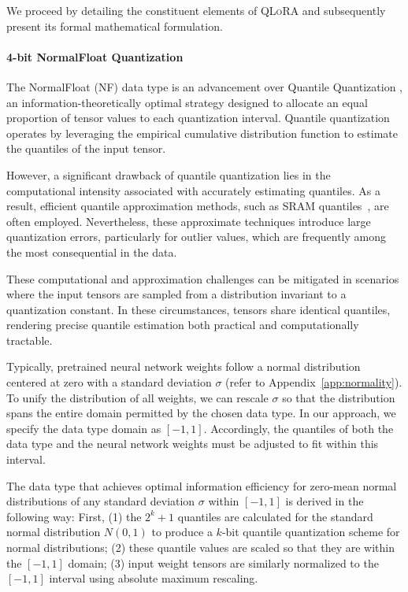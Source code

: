 We proceed by detailing the constituent elements of \textsc{QLoRA} and subsequently present its formal mathematical formulation.

\paragraph{4-bit NormalFloat Quantization} The NormalFloat (NF) data type is an advancement over Quantile Quantization \citep{dettmers2022optimizers}, an information-theoretically optimal strategy designed to allocate an equal proportion of tensor values to each quantization interval. Quantile quantization operates by leveraging the empirical cumulative distribution function to estimate the quantiles of the input tensor.

However, a significant drawback of quantile quantization lies in the computational intensity associated with accurately estimating quantiles. As a result, efficient quantile approximation methods, such as SRAM quantiles~\citep{dettmers2022optimizers}, are often employed. Nevertheless, these approximate techniques introduce large quantization errors, particularly for outlier values, which are frequently among the most consequential in the data.

These computational and approximation challenges can be mitigated in scenarios where the input tensors are sampled from a distribution invariant to a quantization constant. In these circumstances, tensors share identical quantiles, rendering precise quantile estimation both practical and computationally tractable.

Typically, pretrained neural network weights follow a normal distribution centered at zero with a standard deviation $\sigma$ (refer to Appendix~\ref{app:normality}). To unify the distribution of all weights, we can rescale $\sigma$ so that the distribution spans the entire domain permitted by the chosen data type. In our approach, we specify the data type domain as $[-1, 1]$. Accordingly, the quantiles of both the data type and the neural network weights must be adjusted to fit within this interval.

The data type that achieves optimal information efficiency for zero-mean normal distributions of any standard deviation $\sigma$ within $[-1, 1]$ is derived in the following way: First, (1) the $2^k+1$ quantiles are calculated for the standard normal distribution $N(0, 1)$ to produce a $k$-bit quantile quantization scheme for normal distributions; (2) these quantile values are scaled so that they are within the $[-1, 1]$ domain; (3) input weight tensors are similarly normalized to the $[-1, 1]$ interval using absolute maximum rescaling.

